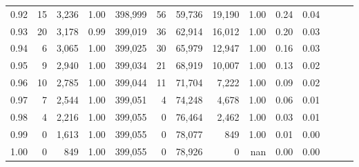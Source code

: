 \begin{tabular}{rrrrrrrrrrrrrr}
0.92 &     15 &  3,236 &  1.00 &  398,999 &       56 &  59,736 &  19,190 &  1.00 &  0.24 &      0.04 \\
0.93 &     20 &  3,178 &  0.99 &  399,019 &       36 &  62,914 &  16,012 &  1.00 &  0.20 &      0.03 \\
0.94 &      6 &  3,065 &  1.00 &  399,025 &       30 &  65,979 &  12,947 &  1.00 &  0.16 &      0.03 \\
0.95 &      9 &  2,940 &  1.00 &  399,034 &       21 &  68,919 &  10,007 &  1.00 &  0.13 &      0.02 \\
0.96 &     10 &  2,785 &  1.00 &  399,044 &       11 &  71,704 &   7,222 &  1.00 &  0.09 &      0.02 \\
0.97 &      7 &  2,544 &  1.00 &  399,051 &        4 &  74,248 &   4,678 &  1.00 &  0.06 &      0.01 \\
0.98 &      4 &  2,216 &  1.00 &  399,055 &        0 &  76,464 &   2,462 &  1.00 &  0.03 &      0.01 \\
0.99 &      0 &  1,613 &  1.00 &  399,055 &        0 &  78,077 &     849 &  1.00 &  0.01 &      0.00 \\
1.00 &      0 &    849 &  1.00 &  399,055 &        0 &  78,926 &       0 &   nan &  0.00 &      0.00 \\
\bottomrule
\end{tabular}
